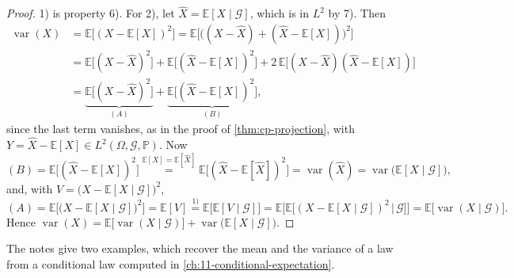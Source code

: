 \begin{proof}
1) is property 6). For 2), let $\hat X=\mathbb E[X\mid\mathcal G]$, which is in $L^2$ by 7). Then
\[
\begin{aligned}
  \operatorname{var}(X)&=\mathbb E\big[(X-\mathbb E[X])^2\big]=\mathbb E\Big[\big((X-\hat X)+(\hat X-\mathbb E[X])\big)^2\Big]\\
  &=\mathbb E\big[(X-\hat X)^2\big]+\mathbb E\big[(\hat X-\mathbb E[X])^2\big]+2\,\mathbb E\big[(X-\hat X)(\hat X-\mathbb E[X])\big]\\
  &=\underbrace{\mathbb E\big[(X-\hat X)^2\big]}_{(A)}+\underbrace{\mathbb E\big[(\hat X-\mathbb E[X])^2\big]}_{(B)},
\end{aligned}
\]
since the last term vanishes, as in the proof of \cref{thm:cp-projection}, with
$Y=\hat X-\mathbb E[X]\in L^2(\Omega,\mathcal G,\mathbb P)$. Now
\[
  (B)=\mathbb E\big[(\hat X-\mathbb E[X])^2\big]\overset{\mathbb E[X]=\mathbb E[\hat X]}{=}\mathbb E\big[(\hat X-\mathbb E[\hat X])^2\big]
  =\operatorname{var}(\hat X)=\operatorname{var}\big(\mathbb E[X\mid\mathcal G]\big),
\]
and, with $V=\big(X-\mathbb E[X\mid\mathcal G]\big)^2$,
\[
  (A)=\mathbb E\Big[\big(X-\mathbb E[X\mid\mathcal G]\big)^2\Big]=\mathbb E[V]\overset{1)}{=}\mathbb E\big[\mathbb E[V\mid\mathcal G]\big]
  =\mathbb E\Big[\mathbb E\big[(X-\mathbb E[X\mid\mathcal G])^2\,\big|\,\mathcal G\big]\Big]
  =\mathbb E\big[\operatorname{var}(X\mid\mathcal G)\big].
\]
Hence $\operatorname{var}(X)=\mathbb E\big[\operatorname{var}(X\mid\mathcal G)\big]+\operatorname{var}\big(\mathbb E[X\mid\mathcal G]\big)$.
\end{proof}

The notes give two examples, which recover the mean and the variance of a law from a conditional
law computed in \cref{ch:11-conditional-expectation}.

